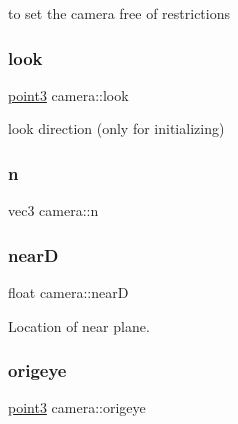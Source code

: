 to set the camera free of restrictions 

\hypertarget{classcamera_af59702993fada81bbb53e3fb287cc642}{}\label{classcamera_af59702993fada81bbb53e3fb287cc642} 
\subsubsection{\texorpdfstring{look}{look}}
{\footnotesize\ttfamily \hyperlink{classpoint3}{point3} camera\+::look\hspace{0.3cm}{\ttfamily [private]}}



look direction (only for initializing) 

\hypertarget{classcamera_ae436426eba7093f7260b5ca5db6c0068}{}\label{classcamera_ae436426eba7093f7260b5ca5db6c0068} 
\subsubsection{\texorpdfstring{n}{n}}
{\footnotesize\ttfamily vec3 camera\+::n\hspace{0.3cm}{\ttfamily [private]}}

\hypertarget{classcamera_acc408f55afe5a320132da72d46498d7d}{}\label{classcamera_acc408f55afe5a320132da72d46498d7d} 
\subsubsection{\texorpdfstring{nearD}{nearD}}
{\footnotesize\ttfamily float camera\+::nearD\hspace{0.3cm}{\ttfamily [private]}}



Location of near plane. 

\hypertarget{classcamera_ad21174a87a185a1054d54bac123abe9a}{}\label{classcamera_ad21174a87a185a1054d54bac123abe9a} 
\subsubsection{\texorpdfstring{origeye}{origeye}}
{\footnotesize\ttfamily \hyperlink{classpoint3}{point3} camera\+::origeye\hspace{0.3cm}{\ttfamily [private]}}



